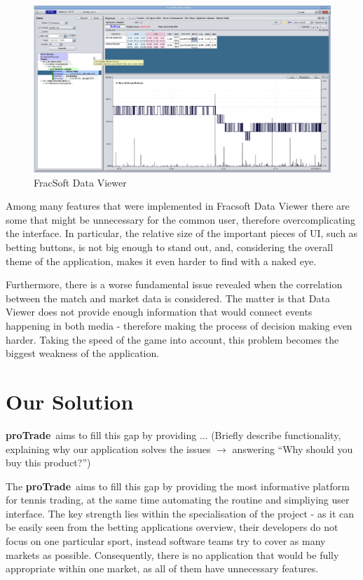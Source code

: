 \documentclass[10pt]{report}
\newcommand{\nm}{{\bf proTrade}}
\newcommand{\nmsp}{{\nm \ }}
\begin{document}
\begin{figure}[h]
\begin{center}
\includegraphics[scale = 0.36]{fracsoft.png}
\end{center}
\caption{FracSoft Data Viewer}
\end{figure}

Among many features that were implemented in Fracsoft Data Viewer there are some that might be unnecessary for the common user, therefore 
overcomplicating the interface. In particular, the relative size of the important pieces of UI, such as betting buttons, is not big enough 
to stand out, and, considering the overall theme of the application, makes it even harder to find with a naked eye.

Furthermore, there is a worse fundamental issue revealed when the correlation between the match and market data is considered. The matter is 
that Data Viewer does not provide enough information that would connect events happening in both media - therefore making the process of decision 
making even harder. Taking the speed of the game into account, this problem becomes the biggest weakness of the application.

\section{Our Solution}

\nmsp aims to fill this gap by providing ... (Briefly describe functionality, explaining why our application solves the issues $\rightarrow$ answering ``Why should you buy this product?'')

The \nmsp aims to fill this gap by providing the most informative platform for tennis trading, at the same time automating the routine and simpliying user 
interface. The key strength lies within the specialisation of the project - as it can be easily seen from the betting applications overview, their developers 
do not focus on one particular sport, instead software teams try to cover as many markets as possible. Consequently, there is no application that would be 
fully appropriate within one market, as all of them have unnecessary features.
\end{document}
